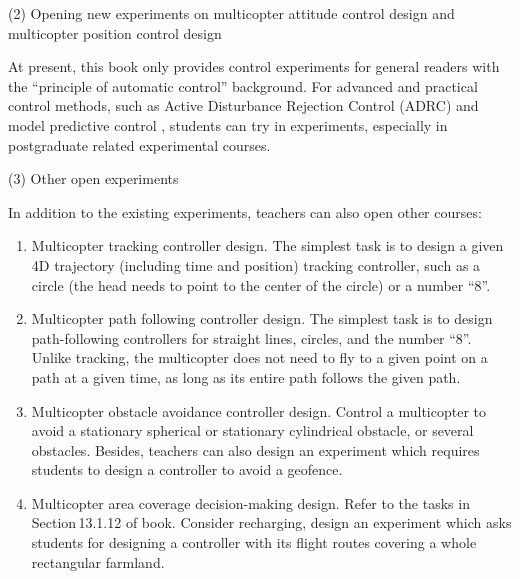 (2) Opening new experiments on multicopter attitude control design
and multicopter position control design

At present, this book only provides control experiments for general
readers with the ``principle of automatic control'' background.
For advanced and practical control methods, such as Active Disturbance
Rejection Control (ADRC) \cite{huang2014active} and model predictive
control \cite{grune2017nonlinear}, students can try in experiments,
especially in postgraduate related experimental courses.

(3) Other open experiments

In addition to the existing experiments, teachers can also open other
courses:
\begin{enumerate}[1) ]
\item Multicopter tracking controller design. The simplest task is to design
a given 4D trajectory (including time and position) tracking controller,
such as a circle (the head needs to point to the center of the circle)
or a number ``8''. 
\item Multicopter path following controller design. The simplest task is
to design path-following controllers for straight lines, circles,
and the number ``8''. Unlike tracking, the multicopter does not
need to fly to a given point on a path at a given time, as long as
its entire path follows the given path.
\item Multicopter obstacle avoidance controller design. Control a multicopter
to avoid a stationary spherical or stationary cylindrical obstacle,
or several obstacles. Besides, teachers can also design an experiment
which requires students to design a controller to avoid a geofence.
\item Multicopter area coverage decision-making design. Refer to the tasks
in Section\,13.1.12 of book\cite{quan2017introduction}. Consider
recharging, design an experiment which asks students for designing
a controller with its flight routes covering a whole rectangular farmland.
\end{enumerate}

